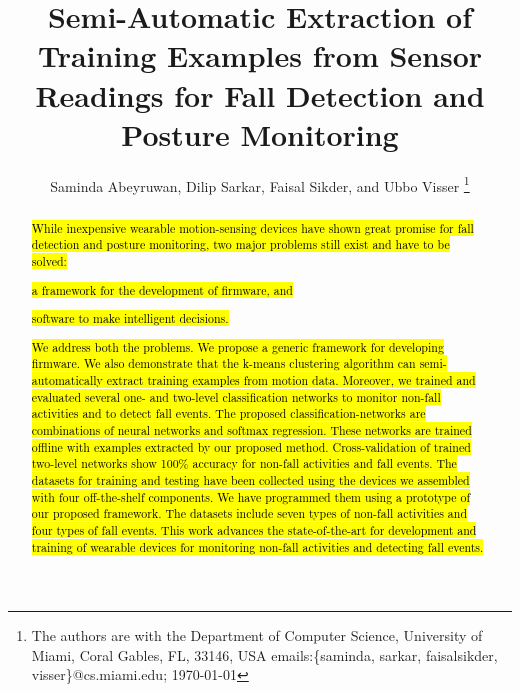 \documentclass[]{IEEEtran}
\title{Semi-Automatic Extraction of Training Examples from Sensor Readings for Fall Detection and Posture Monitoring}
\author{{Saminda Abeyruwan}, {Dilip Sarkar}, {Faisal Sikder}, and {Ubbo Visser}
\thanks{The authors are with the Department of Computer Science, University of Miami,
  Coral Gables, FL, 33146, USA
{ emails:\{saminda, sarkar, faisalsikder, visser\}@cs.miami.edu};
\today} }
\begin{document}
\maketitle
\IEEEpeerreviewmaketitle

\begin{abstract}
\hl{
While inexpensive wearable motion-sensing devices have shown great promise for fall detection and posture monitoring,  two major problems still exist and have to be solved: }\begin{inparaenum}  \item \hl{a framework for the development of firmware, and} \item \hl{software to make intelligent decisions.} \end{inparaenum} \hl{We address both the problems.  
We propose a generic framework for developing firmware. We also demonstrate that the k-means clustering algorithm can semi-automatically extract training examples from motion data. 
Moreover, we trained and evaluated several one- and two-level classification networks to monitor 
non-fall activities and to detect fall events.
The proposed classification-networks are combinations of neural  networks
and softmax regression. 
These networks are trained offline with examples extracted  by our proposed method. Cross-validation of trained two-level networks show 100\% accuracy for non-fall activities and fall events. The datasets for training and testing have been collected using the devices we assembled with four off-the-shelf components. We have programmed them using a prototype of our proposed framework. The datasets include seven types of non-fall activities and four types of fall events.
This work advances the state-of-the-art for development and training of wearable devices for monitoring non-fall activities and detecting fall events.}
%
%
%

\end{abstract}
\end{document}
